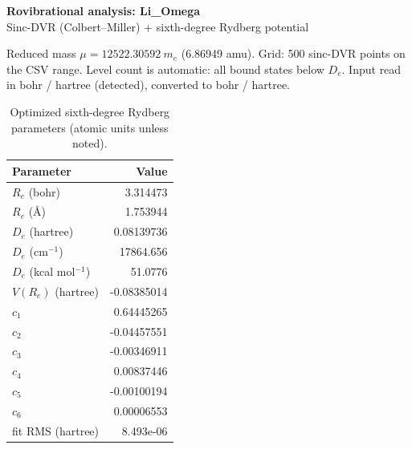 \documentclass[11pt]{article}
\begin{document}
\begin{center}{\Large\bfseries Rovibrational analysis: Li\_Omega}\\[2pt]
{\small Sinc-DVR (Colbert--Miller) + sixth-degree Rydberg potential}\end{center}
\noindent Reduced mass $\mu = 12522.30592\ m_e$ (6.86949 amu). Grid: 500 sinc-DVR points on the CSV range. Level count is automatic: all bound states below $D_e$.
 Input read in bohr / hartree (detected), converted to bohr / hartree.
\vspace{4pt}
\begin{table}[h]\centering\caption{Optimized sixth-degree Rydberg parameters (atomic units unless noted).}
\begin{tabular}{l r}\toprule Parameter & Value \\\midrule
$R_e$ (bohr) & 3.314473 \\
$R_e$ (\AA) & 1.753944 \\
$D_e$ (hartree) & 0.08139736 \\
$D_e$ (cm$^{-1}$) & 17864.656 \\
$D_e$ (kcal mol$^{-1}$) & 51.0776 \\
$V(R_e)$ (hartree) & -0.08385014 \\
$c_1$ & 0.64445265 \\
$c_2$ & -0.04457551 \\
$c_3$ & -0.00346911 \\
$c_4$ & 0.00837446 \\
$c_5$ & -0.00100194 \\
$c_6$ & 0.00006553 \\
fit RMS (hartree) & 8.493e-06 \\
\bottomrule\end{tabular}\end{table}
\end{document}
